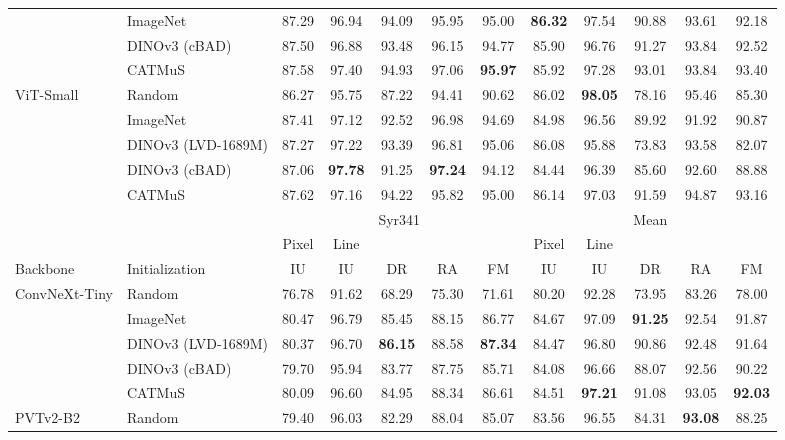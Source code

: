 \begin{table}[htbp]
\begin{tabular*}{\textwidth}{@{\extracolsep{\fill}}ll*{10}{c}@{}}
         & ImageNet & 87.29 & 96.94 & 94.09 & 95.95 & 95.00 & \textbf{86.32} & 97.54 & 90.88 & 93.61 & 92.18 \\
         & DINOv3 (cBAD) & 87.50 & 96.88 & 93.48 & 96.15 & 94.77 & 85.90 & 96.76 & 91.27 & 93.84 & 92.52 \\
         & CATMuS & 87.58 & 97.40 & 94.93 & 97.06 & \textbf{95.97} & 85.92 & 97.28 & 93.01 & 93.84 & 93.40 \\
        \addlinespace[1pt]
        ViT-Small & Random & 86.27 & 95.75 & 87.22 & 94.41 & 90.62 & 86.02 & \textbf{98.05} & 78.16 & 95.46 & 85.30 \\
         & ImageNet & 87.41 & 97.12 & 92.52 & 96.98 & 94.69 & 84.98 & 96.56 & 89.92 & 91.92 & 90.87 \\
         & DINOv3 (LVD-1689M) & 87.27 & 97.22 & 93.39 & 96.81 & 95.06 & 86.08 & 95.88 & 73.83 & 93.58 & 82.07 \\
         & DINOv3 (cBAD) & 87.06 & \textbf{97.78} & 91.25 & \textbf{97.24} & 94.12 & 84.44 & 96.39 & 85.60 & 92.60 & 88.88 \\
         & CATMuS & 87.62 & 97.16 & 94.22 & 95.82 & 95.00 & 86.14 & 97.03 & 91.59 & 94.87 & 93.16 \\
        \midrule
        & & \multicolumn{5}{c}{Syr341} & \multicolumn{5}{c}{Mean} \\
        \cmidrule(lr){3-7}\cmidrule(l){8-12}
        & & Pixel & Line & & & & Pixel & Line & & & \\
        Backbone & Initialization & IU & IU & DR & RA & FM & IU & IU & DR & RA & FM \\
        \midrule
        ConvNeXt-Tiny & Random & 76.78 & 91.62 & 68.29 & 75.30 & 71.61 & 80.20 & 92.28 & 73.95 & 83.26 & 78.00 \\
         & ImageNet & 80.47 & 96.79 & 85.45 & 88.15 & 86.77 & 84.67 & 97.09 & \textbf{91.25} & 92.54 & 91.87 \\
         & DINOv3 (LVD-1689M) & 80.37 & 96.70 & \textbf{86.15} & 88.58 & \textbf{87.34} & 84.47 & 96.80 & 90.86 & 92.48 & 91.64 \\
         & DINOv3 (cBAD) & 79.70 & 95.94 & 83.77 & 87.75 & 85.71 & 84.08 & 96.66 & 88.07 & 92.56 & 90.22 \\
         & CATMuS & 80.09 & 96.60 & 84.95 & 88.34 & 86.61 & 84.51 & \textbf{97.21} & 91.08 & 93.05 & \textbf{92.03} \\
        \addlinespace[1pt]
        PVTv2-B2 & Random & 79.40 & 96.03 & 82.29 & 88.04 & 85.07 & 83.56 & 96.55 & 84.31 & \textbf{93.08} & 88.25 \\

\end{tabular*}
\end{table}
